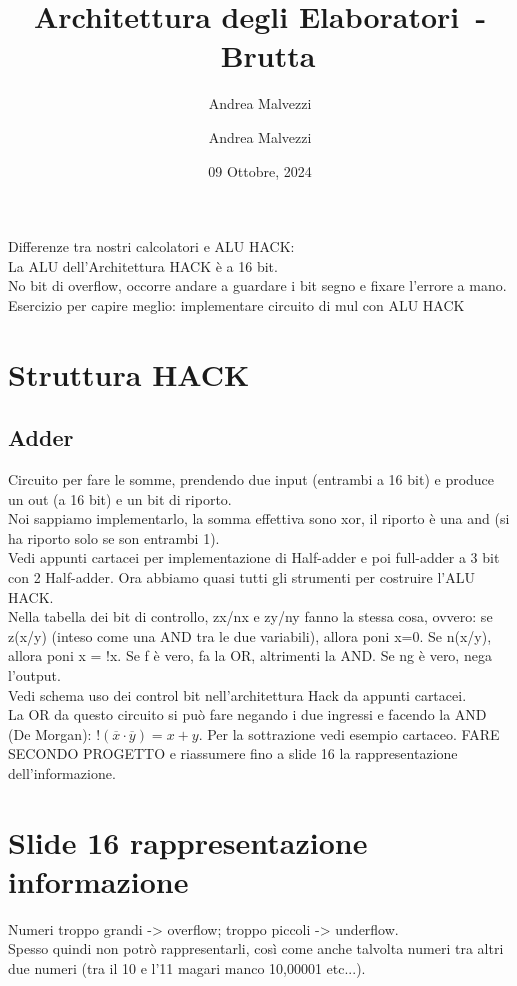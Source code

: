 \documentclass[12pt]{article}
\author{Andrea Malvezzi}
\title{\textbf{Architettura degli Elaboratori~-~Brutta}}
\date{09 Ottobre, 2024}
\author{Andrea Malvezzi}
\begin{document}
\maketitle
\pagebreak
\tableofcontents
\pagebreak
Differenze tra nostri calcolatori e ALU HACK:\\
La ALU dell'Architettura HACK è a 16 bit.\\
No bit di overflow, occorre andare a guardare i bit segno e fixare l'errore a mano.\\
Esercizio per capire meglio: implementare circuito di mul con ALU HACK
\section{Struttura HACK}
\subsection{Adder}
Circuito per fare le somme, prendendo due input (entrambi a 16 bit) e produce un out (a 16 bit) e un bit di riporto.\\
Noi sappiamo implementarlo, la somma effettiva sono xor, il riporto è una and (si ha riporto solo se son entrambi 1).\\
Vedi appunti cartacei per implementazione di Half-adder e poi full-adder a 3 bit con 2 Half-adder.
Ora abbiamo quasi tutti gli strumenti per costruire l'ALU HACK.\\
Nella tabella dei bit di controllo, zx/nx e zy/ny fanno la stessa cosa, ovvero: se z(x/y) (inteso come una AND tra le due variabili), allora poni x=0. Se n(x/y), allora poni x = !x. Se f è vero, fa la OR, altrimenti la AND. Se ng è vero, nega l'output.\\
Vedi schema uso dei control bit nell'architettura Hack da appunti cartacei.\\
La OR da questo circuito si può fare negando i due ingressi e facendo la AND (De Morgan): $!(\overline{x} \cdot \overline{y}) = x + y$.
Per la sottrazione vedi esempio cartaceo. 
FARE SECONDO PROGETTO e riassumere fino a slide 16 la rappresentazione dell'informazione.
\section{Slide 16 rappresentazione informazione}
Numeri troppo grandi -> overflow; troppo piccoli -> underflow.\\
Spesso quindi non potrò rappresentarli, così come anche talvolta numeri tra altri due numeri (tra il 10 e l'11 magari manco 10,00001 etc...).
\end{document}

